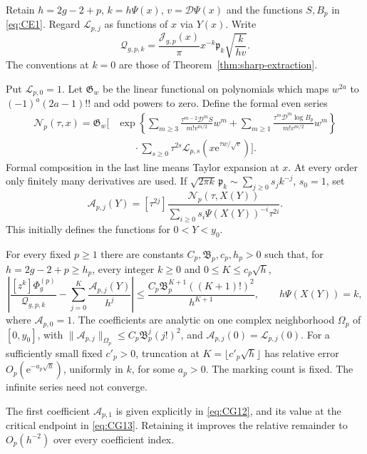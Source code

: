 Retain $h=2g-2+p$, $k=h\Psi(x)$, $v=\mathscr D\Psi(x)$ and the
functions $S,B_p$ in \eqref{eq:CE1}. Regard $\mathcal L_{p,j}$
as functions of $x$ via $Y(x)$. Write
\begin{equation}
 \mathcal Q_{g,p,k}=
 \frac{\mathcal J_{g,p}(x)}\pi x^{-k}\mathfrak p_k
                   \sqrt{\frac{k}{hv}}.
 \label{eq:CG1}
\end{equation}
The conventions at $k=0$ are those of Theorem~\ref{thm:sharp-extraction}.


Put $\mathcal L_{p,0}=1$. Let $\mathfrak G_w$ be the linear functional
on polynomials which maps $w^{2a}$ to $(-1)^a(2a-1)!!$ and odd
powers to zero. Define the formal even series
\begin{equation}
\begin{split}
 \mathcal N_p(\tau,x)=\mathfrak G_w\Bigg[
 &\exp\!\left\{
 \sum_{m\ge3}\frac{\tau^{m-2}\mathscr D^mS}{m!v^{m/2}}w^m
 +\sum_{m\ge1}\frac{\tau^m\mathscr D^m\log B_p}{m!v^{m/2}}w^m
 \right\}\\[-2pt]
 &\hspace{20pt}\cdot\sum_{s\ge0}\tau^{2s}
       \mathcal L_{p,s}(x\mathrm{e}^{\tau w/\sqrt v})\Bigg].
\end{split}
 \label{eq:CG2}
\end{equation}
Formal composition in the last line means Taylor expansion at $x$.
At every order only finitely many derivatives are used. If
$\sqrt{2\pi k}\,\mathfrak p_k\sim\sum_{j\ge0}s_jk^{-j}$, $s_0=1$, set
\begin{equation}
 \mathcal A_{p,j}(Y)=[\tau^{2j}]
       \frac{\mathcal N_p(\tau,X(Y))}
            {\displaystyle\sum_{i\ge0}s_i\Psi(X(Y))^{-i}\tau^{2i}}.
 \label{eq:CG3}
\end{equation}
This initially defines the functions for $0<Y<y_0$.

\begin{theorem}\label{thm:canonical-expansion}
For every fixed $p\ge1$ there are constants $C_p,\mathfrak B_p,c_p,h_p>0$
such that, for $h=2g-2+p\ge h_p$, every integer $k\ge0$ and
$0\le K\le c_p\sqrt h$,
\begin{equation}
 \left|\frac{[z^k]\Phi_g^{(p)}}{\mathcal Q_{g,p,k}}
       -\sum_{j=0}^K\frac{\mathcal A_{p,j}(Y)}{h^j}\right|
 \le\frac{C_p\mathfrak B_p^{K+1}((K+1)!)^2}{h^{K+1}},
 \qquad h\Psi(X(Y))=k,
 \label{eq:CG4}
\end{equation}
where $\mathcal A_{p,0}=1$.
The coefficients are analytic on one complex neighborhood $\Omega_p$
of $[0,y_0]$, with
$\|\mathcal A_{p,j}\|_{\Omega_p}\le C_p\mathfrak B_p^j(j!)^2$, and
$\mathcal A_{p,j}(0)=\mathcal L_{p,j}(0)$.
For a sufficiently small fixed $c'_p>0$, truncation at
$K=\lfloor c'_p\sqrt h\rfloor$ has relative error
$O_p(\mathrm{e}^{-a_p\sqrt h})$, uniformly in $k$, for some $a_p>0$.
The marking count is fixed. The infinite series need not converge.
\end{theorem}

The first coefficient $\mathcal A_{p,1}$ is given explicitly in \eqref{eq:CG12}, and its value at the critical endpoint in \eqref{eq:CG13}. Retaining it improves the relative remainder to $O_p(h^{-2})$ over every coefficient index.


